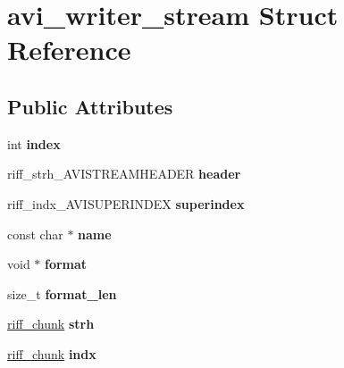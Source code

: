 \hypertarget{structavi__writer__stream}{\section{avi\-\_\-writer\-\_\-stream Struct Reference}
\label{structavi__writer__stream}
}
\subsection*{Public Attributes}
\begin{DoxyCompactItemize}
\item 
\hypertarget{structavi__writer__stream_a721b5b94ce37f8700e4058ea1ae0b1da}{int {\bfseries index}}\label{structavi__writer__stream_a721b5b94ce37f8700e4058ea1ae0b1da}

\item 
\hypertarget{structavi__writer__stream_ac32becbec8a943e82a8c5a395c0de94a}{riff\-\_\-strh\-\_\-\-A\-V\-I\-S\-T\-R\-E\-A\-M\-H\-E\-A\-D\-E\-R {\bfseries header}}\label{structavi__writer__stream_ac32becbec8a943e82a8c5a395c0de94a}

\item 
\hypertarget{structavi__writer__stream_a5ee57c2278d8bf29ccb3fbd909b8dc8d}{riff\-\_\-indx\-\_\-\-A\-V\-I\-S\-U\-P\-E\-R\-I\-N\-D\-E\-X {\bfseries superindex}}\label{structavi__writer__stream_a5ee57c2278d8bf29ccb3fbd909b8dc8d}

\item 
\hypertarget{structavi__writer__stream_a4c2f39d0e88506acab9bbc1e8fe227dc}{const char $\ast$ {\bfseries name}}\label{structavi__writer__stream_a4c2f39d0e88506acab9bbc1e8fe227dc}

\item 
\hypertarget{structavi__writer__stream_a4ff77d296a5cbcdb4ab0c17a43e115a4}{void $\ast$ {\bfseries format}}\label{structavi__writer__stream_a4ff77d296a5cbcdb4ab0c17a43e115a4}

\item 
\hypertarget{structavi__writer__stream_a60e7211eace59072d4dcdb195df7a1a5}{size\-\_\-t {\bfseries format\-\_\-len}}\label{structavi__writer__stream_a60e7211eace59072d4dcdb195df7a1a5}

\item 
\hypertarget{structavi__writer__stream_a3af9876066c58d9682621c80357a76fe}{\hyperlink{structriff__chunk}{riff\-\_\-chunk} {\bfseries strh}}\label{structavi__writer__stream_a3af9876066c58d9682621c80357a76fe}

\item 
\hypertarget{structavi__writer__stream_a94250d9c3b4a0b091c15517f9c34ca7f}{\hyperlink{structriff__chunk}{riff\-\_\-chunk} {\bfseries indx}}\label{structavi__writer__stream_a94250d9c3b4a0b091c15517f9c34ca7f}


\end{DoxyCompactItemize}
